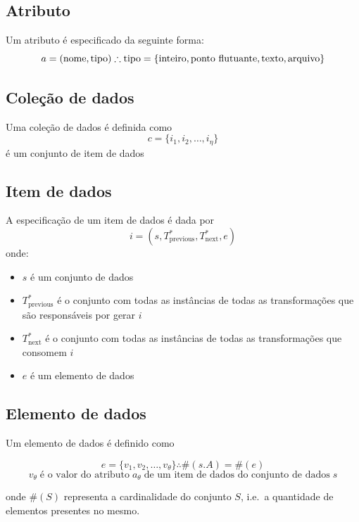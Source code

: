 \subsection{Atributo}

Um atributo é especificado da seguinte forma: \[ a = (\textrm{nome},\textrm{tipo}) \therefore \textrm{tipo} = \{\textup{inteiro}, \textup{ponto flutuante}, \textup{texto}, \textup{arquivo}\} \]

\subsection{Coleção de dados}

Uma coleção de dados é definida como \[ c = \{ i_1, i_2, \ldots, i_{\eta} \} \] é um conjunto de item de dados

\subsection{Item de dados}

A especificação de um item de dados é dada por \[ i = (s, T^{\ast}_{\textrm{previous}}, T^{\ast}_{\textrm{next}}, e) \] onde:

\begin{itemize}
    \item \( s \) é um conjunto de dados
    \item \( T^{\ast}_{\textrm{previous}} \) é o conjunto com todas as instâncias de todas as transformações que são responsáveis por gerar \( i \)
    \item \( T^{\ast}_{\textrm{next}} \) é o conjunto com todas as instâncias de todas as transformações que consomem \( i \)
    \item \( e \) é um elemento de dados
\end{itemize}

\subsection{Elemento de dados}

Um elemento de dados é definido como

\[ e = \{ v_1, v_2, \ldots, v_{\theta} \} \therefore \#(s.A) = \#(e) \]
\[ v_{\theta} \; \textrm{é o valor do atributo} \; a_{\theta} \; \textrm{de um item de dados do conjunto de dados} \; s \]

onde \( \#(S) \) representa a cardinalidade do conjunto \( S \), i.e.\ a quantidade de elementos presentes no mesmo.

